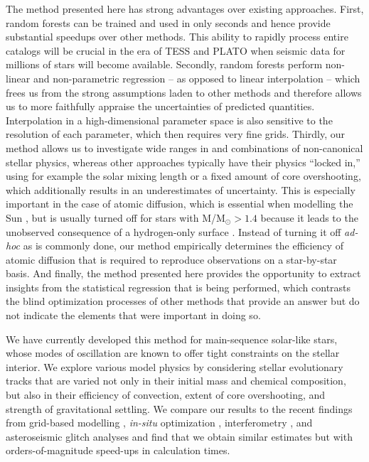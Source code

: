 \documentclass[manuscript]{aastex}
\begin{document}
The method presented here has strong advantages over existing approaches. First, random forests can be trained and used in only seconds and hence provide substantial speedups over other methods. This ability to rapidly process entire catalogs will be crucial in the era of TESS \citep{2015JATIS...1a4003R} and PLATO \citep{2014ExA....38..249R} when seismic data for millions of stars will become available. Secondly, random forests perform non-linear and non-parametric regression -- as opposed to linear interpolation -- which frees us from the strong assumptions laden to other methods and therefore allows us to more faithfully appraise the uncertainties of predicted quantities. Interpolation in a high-dimensional parameter space is also sensitive to the resolution of each parameter, which then requires very fine grids. Thirdly, our method allows us to investigate wide ranges in and combinations of non-canonical stellar physics, whereas other approaches typically have their physics ``locked in,'' using for example the solar mixing length or a fixed amount of core overshooting, which additionally results in an underestimates of uncertainty. This is especially important in the case of atomic diffusion, which is essential when modelling the Sun \citep[see e.g.][]{1994MNRAS.269.1137B}, but is usually turned off for stars with M/M$_\odot > 1.4$ because it leads to the unobserved consequence of a hydrogen-only surface \citep{2002A&A...390..611M}. Instead of turning it off \emph{ad-hoc} as is commonly done, our method empirically determines the efficiency of atomic diffusion that is required to reproduce observations on a star-by-star basis. And finally, the method presented here provides the opportunity to extract insights from the statistical regression that is being performed, which contrasts the blind optimization processes of other methods that provide an answer but do not indicate the elements that were important in doing so. 

We have currently developed this method for main-sequence solar-like stars, whose modes of oscillation are known to offer tight constraints on the stellar interior. We explore various model physics by considering stellar evolutionary tracks that are varied not only in their initial mass and chemical composition, but also in their efficiency of convection, extent of core overshooting, and strength of gravitational settling. We compare our results to the recent findings from grid-based modelling \citep{2015MNRAS.452.2127S}, \emph{in-situ} optimization \citep{2015ApJ...811L..37M}, interferometry \citep{2013MNRAS.433.1262W}, and asteroseismic glitch analyses \citep{2014ApJ...790..138V} and find that we obtain similar estimates but with orders-of-magnitude speed-ups in calculation times. 
\end{document}
